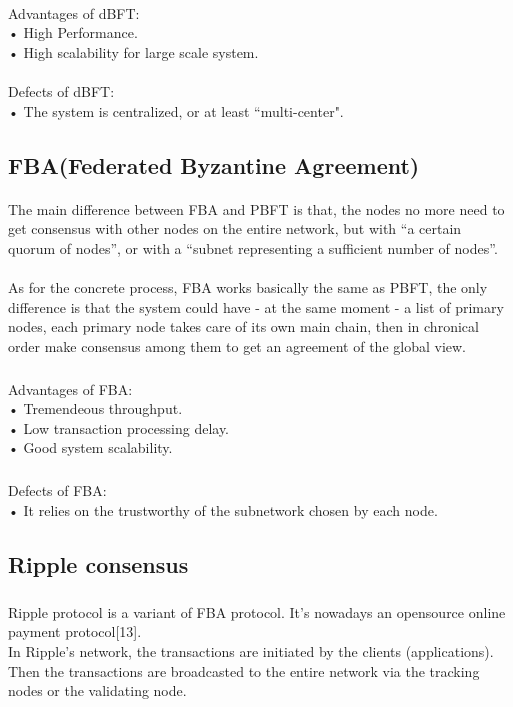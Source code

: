 \documentclass[]{article}
\begin{document}
\begin{CJK*}{UTF8}{gbsn}
	\paragraph{} 
Advantages of dBFT:
\\• High Performance.
\\• High scalability for large scale system.
	\paragraph{} 
Defects of dBFT:	
\\• The system is centralized, or at least ``multi-center".
	
	\subsection{FBA(Federated Byzantine Agreement)}
	\paragraph{} 
	The main difference between FBA and PBFT is that, the nodes no more need to get consensus with other nodes on the entire network, but with ``a certain quorum of nodes'', or with a ``subnet representing a sufficient number of nodes''.
	
	\paragraph{} 
	As for the concrete process, FBA works basically the same as PBFT, the only difference is that the system could have - at the same moment - a list of primary nodes, each primary node takes care of its own main chain, then in chronical order make consensus among them to get an agreement of the global view.
	
	\subparagraph{} 
Advantages of FBA:
\\• Tremendeous throughput.
\\• Low transaction processing delay.
\\• Good system scalability.
	\subparagraph{} 
Defects of FBA:	
\\• It relies on the trustworthy of the subnetwork chosen by each node.
	
	\subsection{Ripple consensus}
	\subparagraph{}  
	Ripple protocol is a variant of FBA protocol. It's nowadays an opensource online payment protocol[13].
	\\
	In Ripple's network, the transactions are initiated by the clients (applications). Then the transactions are broadcasted to the entire network via the tracking nodes or the validating node.


\end{CJK*}
\end{document}
